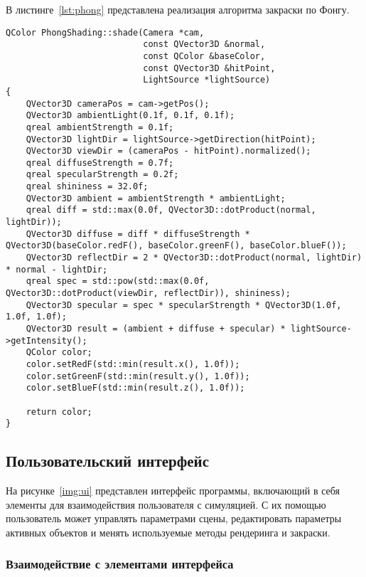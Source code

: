 \clearpage

В листинге~\ref{lst:phong} представлена реализация алгоритма закраски по Фонгу.

\begin{lstlisting}[label=lst:phong,caption=Алгоритм закраски по Фонгу]
QColor PhongShading::shade(Camera *cam,
                           const QVector3D &normal,
                           const QColor &baseColor,
                           const QVector3D &hitPoint,
                           LightSource *lightSource)
{
    QVector3D cameraPos = cam->getPos();
    QVector3D ambientLight(0.1f, 0.1f, 0.1f);
    qreal ambientStrength = 0.1f;
    QVector3D lightDir = lightSource->getDirection(hitPoint);
    QVector3D viewDir = (cameraPos - hitPoint).normalized();
    qreal diffuseStrength = 0.7f;
    qreal specularStrength = 0.2f;
    qreal shininess = 32.0f;
    QVector3D ambient = ambientStrength * ambientLight;
    qreal diff = std::max(0.0f, QVector3D::dotProduct(normal, lightDir));
    QVector3D diffuse = diff * diffuseStrength * QVector3D(baseColor.redF(), baseColor.greenF(), baseColor.blueF());
    QVector3D reflectDir = 2 * QVector3D::dotProduct(normal, lightDir) * normal - lightDir;
    qreal spec = std::pow(std::max(0.0f, QVector3D::dotProduct(viewDir, reflectDir)), shininess);
    QVector3D specular = spec * specularStrength * QVector3D(1.0f, 1.0f, 1.0f);
    QVector3D result = (ambient + diffuse + specular) * lightSource->getIntensity();
    QColor color;
    color.setRedF(std::min(result.x(), 1.0f));
    color.setGreenF(std::min(result.y(), 1.0f));
    color.setBlueF(std::min(result.z(), 1.0f));

    return color;
}
\end{lstlisting}

\subsection{Пользовательский интерфейс}

На рисунке~\ref{img:ui} представлен интерфейс программы, включающий в себя элементы
для взаимодействия пользователя с симуляцией. С их помощью пользователь может управлять параметрами сцены,
редактировать параметры активных объектов и менять используемые методы рендеринга и закраски.


\subsubsection{Взаимодействие с элементами интерфейса}

